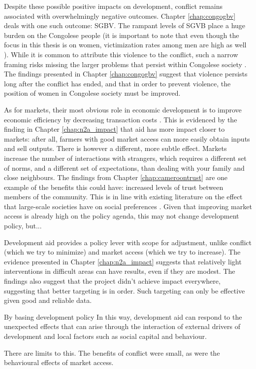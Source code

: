 Despite these possible positive impacts on development, conflict remains associated with overwhelmingly negative outcomes. Chapter \ref{chap:congogbv} deals with one such outcome: SGBV. The rampant levels of SGVB place a huge burden on the Congolese people (it is important to note that even though the focus in this thesis is on women, victimization rates among men are high as well ). While it is common to attribute this violence to the conflict, such a narrow framing risks missing the larger problems that persist within Congolese society \citep[see e.g.][]{Autesserre2012a}. The findings presented in Chapter \ref{chap:congogbv} suggest that violence persists long after the conflict has ended, and that in order to prevent violence, the position of women in Congolese society must be improved.

As for markets, their most obvious role in economic development is to improve economic efficiency by decreasing transaction costs . This is evidenced by the finding in Chapter \ref{chap:n2a_impact} that aid has more impact closer to markets: after all, farmers with good market access can more easily obtain inputs and sell outputs. There is however a different, more subtle effect. Markets increase the number of interactions with strangers, which requires a different set of norms, and a different set of expectations, than dealing with your family and close neighbours. The findings from Chapter \ref{chap:cameroontrust} are one example of the benefits this could have: increased levels of trust between members of the community. This is in line with existing literature on the effect that large-scale societies have on social preferences \citep{Henrich2010}.  Given that improving market access is already high on the policy agenda, this may not change development policy, but... 

Development aid provides a policy lever with scope for adjustment, unlike conflict (which we try to minimize) and market access (which we try to increase). The evidence presented in Chapter \ref{chap:n2a_impact} suggests that relatively light interventions in difficult areas can have results, even if they are modest. The findings also suggest that the project didn't achieve impact everywhere, suggesting that better targeting is in order. Such targeting can only be effective given good and reliable data. 

By basing development policy In this way, development aid can respond to the unexpected effects that can arise through the interaction of external drivers of development and local factors such as social capital and behaviour.

There are limits to this. The benefits of conflict were small, as were the behavioural effects of market access.  




%